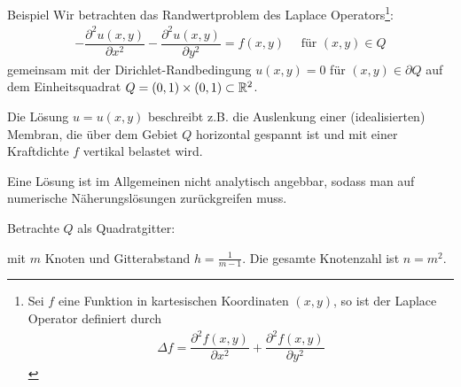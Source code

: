\begin{colboxBreakable}{Beispiel}
  Wir betrachten das Randwertproblem des Laplace Operators\footnote{
    Sei $f$ eine Funktion in kartesischen Koordinaten $(x,y)$, so ist der Laplace Operator definiert durch 
    \begin{align*}
      \Delta f = \dfrac{\partial^2 f(x,y)}{\partial x^2} + \dfrac{\partial^2 f(x,y)}{\partial y^2}
    \end{align*}
    }:
  \begin{align*}
    -\dfrac{\partial^2 u(x,y)}{\partial x^2} 
    - \dfrac{\partial^2 u(x,y)}{\partial y^2} 
    = f(x,y) \quad 
    \text{ für } (x,y)\in Q
  \end{align*}
  gemeinsam mit der Dirichlet-Randbedingung $u(x,y)=0$ für $(x,y)\in \partial Q$ auf dem Einheitsquadrat 
  $Q=(0,1)\times(0,1)\subset\mathbb R^2$. 

  Die Lösung $u=u(x,y)$ beschreibt z.B. die Auslenkung einer (idealisierten) Membran, die über dem Gebiet $Q$ 
  horizontal gespannt ist und mit einer Kraftdichte $f$ vertikal belastet wird. 

  Eine Lösung ist im Allgemeinen nicht analytisch angebbar, sodass man auf numerische Näherungslösungen 
  zurückgreifen muss.

  Betrachte $Q$ als Quadratgitter: 

  \begin{center}
    
  \end{center}

  mit $m$ Knoten und Gitterabstand $h=\tfrac{1}{m-1}$. Die gesamte Knotenzahl ist $n=m^2$. 


\end{colboxBreakable}
